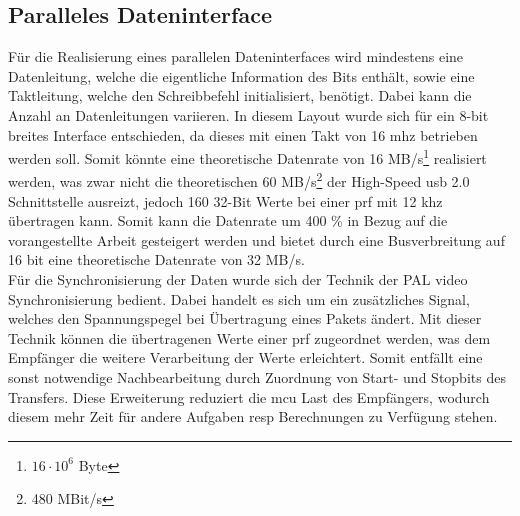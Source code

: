\subsection{Paralleles Dateninterface}\label{subsec:interface_parallel}
Für die Realisierung eines parallelen Dateninterfaces wird mindestens eine Datenleitung, welche die eigentliche Information des Bits enthält, sowie eine Taktleitung, welche den Schreibbefehl initialisiert, benötigt. Dabei kann die Anzahl an Datenleitungen variieren. In diesem Layout wurde sich für ein 8-bit breites Interface entschieden, da dieses mit einen Takt von 16 \ac{mhz} betrieben werden soll. Somit könnte eine theoretische Datenrate von 16 MB/s\footnote{$16\cdot 10^6$ Byte} realisiert werden, was zwar nicht die theoretischen 60 MB/s\footnote{480 MBit/s} der High-Speed \ac{usb} 2.0 Schnittstelle ausreizt, jedoch 160 32-Bit Werte bei einer \ac{prf} mit 12 \ac{khz} übertragen kann. Somit kann die Datenrate um 400 \% in Bezug auf die vorangestellte Arbeit gesteigert werden und bietet durch eine Busverbreitung auf 16 bit eine theoretische Datenrate von 32 MB/s.\\
Für die Synchronisierung der Daten wurde sich der Technik der PAL video Synchronisierung bedient. Dabei handelt es sich um ein zusätzliches Signal, welches den Spannungspegel bei Übertragung eines Pakets ändert. Mit dieser Technik können die übertragenen Werte einer \ac{prf} zugeordnet werden, was dem Empfänger die weitere Verarbeitung der Werte erleichtert. Somit entfällt eine sonst notwendige Nachbearbeitung durch Zuordnung von Start- und Stopbits des Transfers. Diese Erweiterung reduziert die \ac{mcu} Last des Empfängers, wodurch diesem mehr Zeit für andere Aufgaben \ac{resp} Berechnungen zu Verfügung stehen.
%
%
%

\setlength{\unitlength}{1cm}
\newcommand*{\clki}{
  \draw (t_cur) -- ++(0,.3) -- ++(.5,0) -- ++(0,-.6) -- ++(.5,0) -- ++(0,.3)
    node[time] (t_cur) {};
}

\newcommand*{\bitvector}[3]{
  \draw[fill=#3] (t_cur) -- ++( .1, .3) -- ++(#2-.2,0) -- ++(.1, -.3)
                         -- ++(-.1,-.3) -- ++(.2-#2,0) -- cycle;
  \path (t_cur) -- node[anchor=mid] {#1} ++(#2,0) node[time] (t_cur) {};
}

\newcommand*{\known}[2]{
    \bitvector{#1}{#2}{white}
}

\newcommand*{\unknown}[2][XXX]{
    \bitvector{#1}{#2}{black!20}
}

